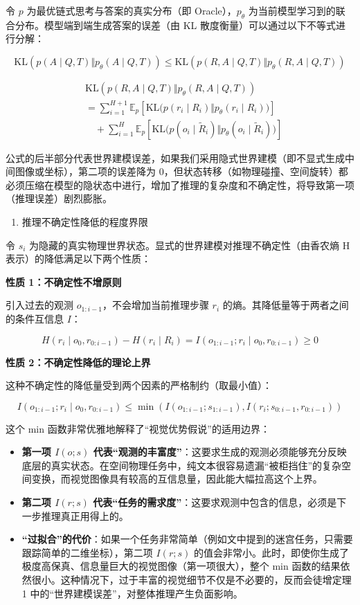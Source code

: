 令 \(p\) 为最优链式思考与答案的真实分布（即 Oracle），\(p_{\theta}\) 为当前模型学习到的联合分布。模型端到端生成答案的误差（由 KL 散度衡量）可以通过以下不等式进行分解：

\[
\mathrm{KL}(p(A\mid Q,T)\Vert p_{\theta}(A\mid Q,T))
\le
\mathrm{KL}(p(R,A\mid Q,T)\Vert p_{\theta}(R,A\mid Q,T))
\]

\[
\begin{aligned}
&\mathrm{KL}(p(R,A\mid Q,T)\Vert p_{\theta}(R,A\mid Q,T))
\\
&=
\sum_{i=1}^{H+1}\mathbb{E}_{p}\left[
\mathrm{KL}\bigl(p(r_i\mid R_i)\Vert p_{\theta}(r_i\mid R_i)\bigr)
\right]
\\
&\quad+
\sum_{i=1}^{H}\mathbb{E}_{p}\left[
\mathrm{KL}\bigl(p(o_i\mid\tilde R_i)\Vert p_{\theta}(o_i\mid\tilde R_i)\bigr)
\right]
\end{aligned}
\]

公式的后半部分代表世界建模误差，如果我们采用隐式世界建模（即不显式生成中间图像或坐标），第二项的误差降为 0，但状态转移（如物理碰撞、空间旋转）都必须压缩在模型的隐状态中进行，增加了推理的复杂度和不确定性，将导致第一项（推理误差）剧烈膨胀。

\begin{enumerate}
\def\labelenumi{\arabic{enumi}.}
\setcounter{enumi}{1}
\tightlist
\item
  推理不确定性降低的程度界限
\end{enumerate}

令 \(s_i\) 为隐藏的真实物理世界状态。显式的世界建模对推理不确定性（由香农熵 H 表示）的降低满足以下两个性质：

\textbf{性质 1：不确定性不增原则}

引入过去的观测 \(o_{1:i-1}\)，不会增加当前推理步骤 \(r_i\) 的熵。其降低量等于两者之间的条件互信息 \(I\)：

\[
H(r_i\mid o_0,r_{0:i-1})-H(r_i\mid R_i)
=I(o_{1:i-1};r_i\mid o_0,r_{0:i-1})\ge0
\]

\textbf{性质 2：不确定性降低的理论上界}

这种不确定性的降低量受到两个因素的严格制约（取最小值）：

\[
I(o_{1:i-1};r_i\mid o_0,r_{0:i-1})
\le
\min\left(
I(o_{1:i-1};s_{1:i-1}),
I(r_i;s_{0:i-1},r_{0:i-1})
\right)
\]

这个 min 函数非常优雅地解释了``视觉优势假说''的适用边界：

\begin{itemize}
\tightlist
\item
  \textbf{第一项 \(I(o;s)\) 代表``观测的丰富度''}：这要求生成的观测必须能够充分反映底层的真实状态。在空间物理任务中，纯文本很容易遗漏``被柜挡住''的复杂空间变换，而视觉图像具有较高的互信息量，因此能大幅拉高这个上界。
\item
  \textbf{第二项 \(I(r;s)\) 代表``任务的需求度''}：这要求观测中包含的信息，必须是下一步推理真正用得上的。
\item
  \textbf{``过拟合''的代价}：如果一个任务非常简单（例如文中提到的迷宫任务，只需要跟踪简单的二维坐标），第二项 \(I(r;s)\) 的值会非常小。此时，即使你生成了极度高保真、信息量巨大的视觉图像（第一项很大），整个 min 函数的结果依然很小。这种情况下，过于丰富的视觉细节不仅是不必要的，反而会徒增定理 1 中的``世界建模误差''，对整体推理产生负面影响。
\end{itemize}

